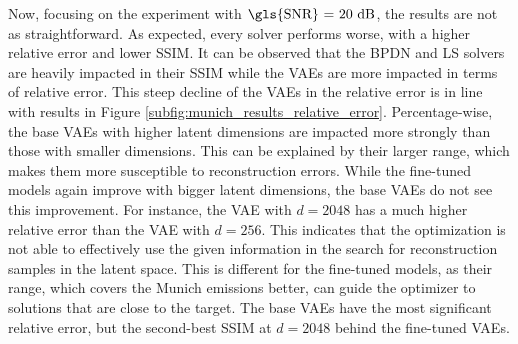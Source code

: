 Now, focusing on the experiment with $\text{\gls{SNR} = 20 \unit{dB}}$, the results are not as straightforward.
As expected, every solver performs worse, with a higher relative error and lower \gls{SSIM}.
It can be observed that the \gls{BPDN} and \gls{LS} solvers are heavily impacted in their \gls{SSIM} while the \gls{VAE}s are more impacted in terms of relative error.
This steep decline of the \gls{VAE}s in the relative error is in line with results in Figure \ref{subfig:munich_results_relative_error}.
Percentage-wise, the base \gls{VAE}s with higher latent dimensions are impacted more strongly than those with smaller dimensions.
This can be explained by their larger range, which makes them more susceptible to reconstruction errors.
While the fine-tuned models again improve with bigger latent dimensions, the base \gls{VAE}s do not see this improvement.
For instance, the \gls{VAE} with $d = 2048$ has a much higher relative error than the \gls{VAE} with $d = 256$. 
This indicates that the optimization is not able to effectively use the given information in the search for reconstruction samples in the latent space.
This is different for the fine-tuned models, as their range, which covers the Munich emissions better, can guide the optimizer to solutions that are close to the target.
The base \gls{VAE}s have the most significant relative error, but the second-best \gls{SSIM} at $d = 2048$ behind the fine-tuned VAEs.



